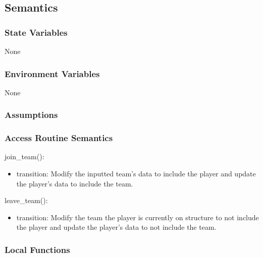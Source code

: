 \documentclass[12pt, titlepage]{article}
\begin{document}
\subsection{Semantics}

\subsubsection{State Variables}

None

\subsubsection{Environment Variables}

None

\subsubsection{Assumptions}


\subsubsection{Access Routine Semantics}

\noindent join\_team():
\begin{itemize}
\item transition: Modify the inputted team's data to include the player and
update the player's data to include the team.
\end{itemize}

\noindent leave\_team():
\begin{itemize}
\item transition: Modify the team the player is currently on structure to not
include the player and update the player's data to not include the team.
\end{itemize}

\subsubsection{Local Functions}

 
\end{document}
